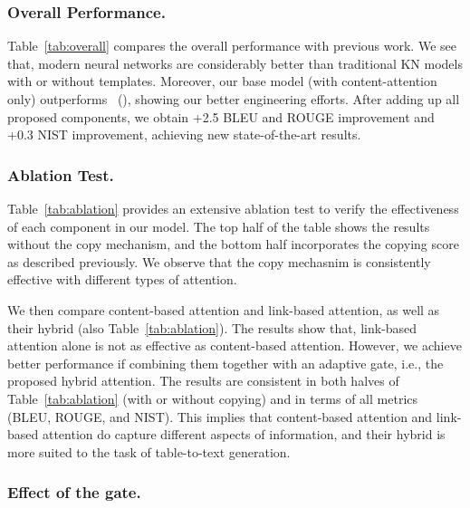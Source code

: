 \documentclass[letterpaper]{article} %
\newcommand{\newcite}[1]{\citeauthor{#1}~(\citeyear{#1})}
\begin{document}
\subsubsection{Overall Performance.}
Table~\ref{tab:overall} compares the overall performance with previous work. We see that, modern neural networks are considerably better than traditional KN models with or without templates. Moreover, our base model (with content-attention only) outperforms \newcite{wikibio}, showing our better engineering efforts. After adding up all proposed components, we obtain +2.5 BLEU and ROUGE improvement and +0.3 NIST improvement, achieving new state-of-the-art results.

\subsubsection{Ablation Test.}
Table~\ref{tab:ablation} provides an extensive ablation test to verify the effectiveness of each component in our model. The top half of the table shows the results without the copy mechanism, and the bottom half incorporates the copying score as described previously. We observe that the copy mechasnim is consistently effective with different types of attention.


We then compare content-based attention and link-based attention, as well as their hybrid (also Table~\ref{tab:ablation}). The results show that, link-based attention alone is not as effective as content-based attention. However, we achieve better  performance if combining them together with an adaptive gate, i.e., the proposed hybrid attention.
The results are consistent in both halves of Table~\ref{tab:ablation} (with or without copying) and in terms of all metrics (BLEU, ROUGE, and NIST). This implies that content-based attention and link-based attention do capture different aspects of information, and their hybrid is more suited to the task of table-to-text generation.

\subsubsection{Effect of the gate.}
\end{document}
